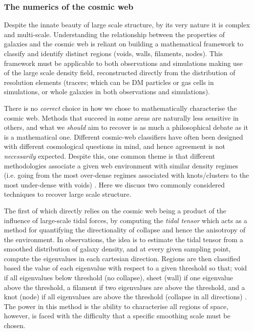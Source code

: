 \subsubsection{The numerics of the cosmic web}
Despite the innate beauty of large scale structure, by its very nature it is complex and multi-scale. Understanding the relationship between the properties of galaxies and the cosmic web is reliant on building a mathematical framework to classify and identify distinct regions (voids, walls, filaments, nodes). This framework must be applicable to both observations and simulations making use of the large scale density field, reconstructed directly from the distribution of resolution elements (tracers; which can be DM particles or gas cells in simulations, or whole galaxies in both observations and simulations). 

There is no \textit{correct} choice in how we chose to mathematically characterise the cosmic web. Methods that succeed in some areas are naturally less sensitive in others, and what we \textit{should} aim to recover is as much a philosophical debate as it is a mathematical one. Different cosmic-web classifiers have often been designed with different cosmological questions in mind, and hence agreement is not \textit{necessarily} expected. Despite this, one common theme is that different methodologies associate a given web environment with similar density regimes (i.e. going from the most over-dense regimes associated with knots/clusters to the most under-dense with voids) \citep{libeskind2018}. Here we discuss two commonly considered techniques to recover large scale structure.

The first of which directly relies on the cosmic web being a product of the influence of large-scale tidal forces, by computing the \textit{tidal tensor} which acts as a method for quantifying the directionality of collapse and hence the anisotropy of the environment. In observations, the idea is to estimate the tidal tensor from a smoothed distribution of galaxy density, and at every given sampling point, compute the eigenvalues in each cartesian direction. Regions are then classified based the value of each eigenvalue with respect to a given threshold so that; void if all eigenvalues below threshold (no collapse), sheet (wall) if one eigenvalue above the threshold, a filament if two eigenvalues are above the threshold, and a knot (node) if all eigenvalues are above the threshold (collapse in all directions) \citep[e.g.][]{eardley2015}. The power in this method is the ability to characterise all regions of space, however, is faced with the difficulty that a specific smoothing scale must be chosen.

